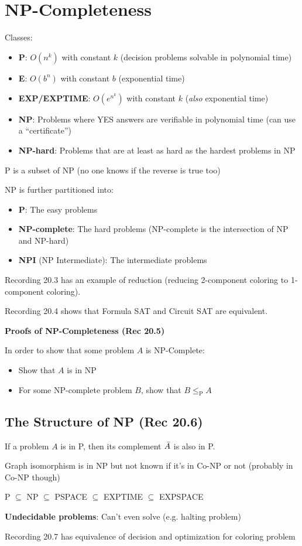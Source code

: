 \section{NP-Completeness}

Classes:
\begin{itemize}
    \item \textbf{P}: $O(n^k)$ with constant $k$ (decision problems solvable in polynomial time)
    \item \textbf{E}: $O(b^n)$ with constant $b$ (exponential time)
    \item \textbf{EXP/EXPTIME}: $O(e^{n^k})$ with constant $k$ (\emph{also} exponential time)
    \item \textbf{NP}: Problems where YES answers are verifiable in polynomial time (can use a ``certificate'')
    \item \textbf{NP-hard}: Problems that are at least as hard as the hardest problems in NP
\end{itemize}

P is a subset of NP (no one knows if the reverse is true too)

NP is further partitioned into:
\begin{itemize}
    \item \textbf{P}: The easy problems
    \item \textbf{NP-complete}: The hard problems (NP-complete is the intersection of NP and NP-hard)
    \item \textbf{NPI} (NP Intermediate): The intermediate problems
\end{itemize}

Recording 20.3 has an example of reduction (reducing 2-component coloring to 1-component coloring).

Recording 20.4 shows that Formula SAT and Circuit SAT are equivalent.

\textbf{Proofs of NP-Completeness (Rec 20.5)}

In order to show that some problem $A$ is NP-Complete:
\begin{itemize}
    \item Show that $A$ is in NP
    \item For some NP-complete problem $B$, show that $B \leq_{\mathrm P} A$
\end{itemize}

\subsection*{The Structure of NP (Rec 20.6)}

If a problem $A$ is in P, then its complement $\Bar{A}$ is also in P.

Graph isomorphism is in NP but not known if it's in Co-NP or not (probably in Co-NP though)

P $\subseteq$ NP $\subseteq$ PSPACE $\subseteq$ EXPTIME $\subseteq$ EXPSPACE

\textbf{Undecidable problems}: Can't even solve (e.g. halting problem)

Recording 20.7 has equivalence of decision and optimization for coloring problem


